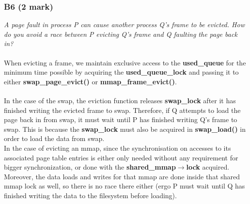 \documentclass{report}
\newcommand{\question}[1]{\textit{#1} \ }
\newcommand{\fun}[1]{\textcolor{Emerald}{\textbf{#1}}}
\newcommand{\var}[1]{\textcolor{RoyalPurple}{\textbf{#1}}}
\begin{document}
			\subsubsection*{B6 (2 mark)}
				\question{A page fault in process P can cause another process Q's frame
				to be evicted. How do you avoid a race between P evicting Q's frame and 
				Q faulting the page back in?}
				\\
				\\ When evicting a frame, we maintain exclusive access to the 
				\var{used\_queue} for the minimum time possible by acquiring 
				the \var{used\_queue\_lock} and passing it to either
				\fun{swap\_page\_evict()} or \fun{mmap\_frame\_evict()}. 
				\\
				\\In the case of the swap, the eviction function releases
				\var{swap\_lock} after it has finished writing the evicted frame
				to swap. Therefore, if Q attempts to load the page back in 
				from swap, it must wait until P has finished writing Q's 
				frame to swap. This is because the \var{swap\_lock} must also be 
				acquired in \fun{swap\_load()} in order to load the data from 
				swap.
				\\ In the case of evicting an mmap, since the synchronisation on
				accesses to its associated page table entries is either only
				needed without any requirement for bigger synchronization, or
				done with the \var{shared\_mmap$\to$lock} acquired. Moreover, the data
				loads and writes for that mmap are done inside that shared mmap lock
				as well, so there is no race there either (ergo P must wait until
				Q has finished writing the data to the filesystem before loading).
\end{document}
